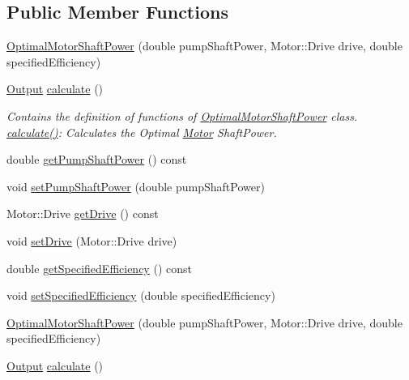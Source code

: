 \subsection*{Public Member Functions}
\begin{DoxyCompactItemize}
\item 
\hyperlink{class_optimal_motor_shaft_power_ad830e1f8a7931e3c6bec5f8828d57e83}{Optimal\+Motor\+Shaft\+Power} (double pump\+Shaft\+Power, Motor\+::\+Drive drive, double specified\+Efficiency)
\item 
\hyperlink{struct_optimal_motor_shaft_power_1_1_output}{Output} \hyperlink{class_optimal_motor_shaft_power_a486edea429b828e5d989fb32034f4059}{calculate} ()
\begin{DoxyCompactList}\small\item\em Contains the definition of functions of \hyperlink{class_optimal_motor_shaft_power}{Optimal\+Motor\+Shaft\+Power} class. \hyperlink{class_optimal_motor_shaft_power_a486edea429b828e5d989fb32034f4059}{calculate()}\+: Calculates the Optimal \hyperlink{struct_motor}{Motor} Shaft\+Power. \end{DoxyCompactList}\item 
double \hyperlink{class_optimal_motor_shaft_power_aca7bb632c659ecf2ebf3cb9fdb23626f}{get\+Pump\+Shaft\+Power} () const
\item 
void \hyperlink{class_optimal_motor_shaft_power_ab2d80927fbaa62705359700b2a8f2f26}{set\+Pump\+Shaft\+Power} (double pump\+Shaft\+Power)
\item 
Motor\+::\+Drive \hyperlink{class_optimal_motor_shaft_power_a3cc369285d8b3582fcd8c44e5a1c37c8}{get\+Drive} () const
\item 
void \hyperlink{class_optimal_motor_shaft_power_a8f3288a69848c61f4e8e2b14da549d16}{set\+Drive} (Motor\+::\+Drive drive)
\item 
double \hyperlink{class_optimal_motor_shaft_power_a89c2038dae30ef58245e810187c2a6c4}{get\+Specified\+Efficiency} () const
\item 
void \hyperlink{class_optimal_motor_shaft_power_a92f7da022e380abbd8cfd308e8aa5e58}{set\+Specified\+Efficiency} (double specified\+Efficiency)
\item 
\hyperlink{class_optimal_motor_shaft_power_ad830e1f8a7931e3c6bec5f8828d57e83}{Optimal\+Motor\+Shaft\+Power} (double pump\+Shaft\+Power, Motor\+::\+Drive drive, double specified\+Efficiency)
\item 
\hyperlink{struct_optimal_motor_shaft_power_1_1_output}{Output} \hyperlink{class_optimal_motor_shaft_power_a1448024727106660d94faf7f9ff2c89e}{calculate} ()

\end{DoxyCompactItemize}
